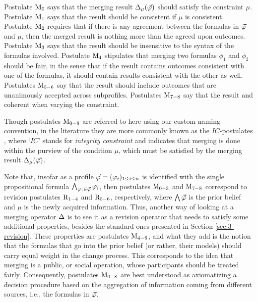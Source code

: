 Postulate $\ppm{0}$ says that the merging result $\me_{\mu}(\P)$ should
satisfy the constraint $\mu$.
Postulate $\ppm{1}$ says that the result 
should be consistent if $\mu$ is consistent.
Postulate $\ppm{2}$ requires that if there 
is any agreement between the formulas in $\P$ and $\mu$,
then the merged result is nothing more than the agreed upon outcomes.
Postulate $\ppm{3}$ says that the result 
should be insensitive to the syntax of the formulas involved.
Postulate $\ppm{4}$ stipulates that merging two formulas $\phi_1$ and $\phi_2$ should be fair,
in the sense that if the result contains outcomes consistent with one of the formulas, it should contain 
results consistent with the other as well.
Postulates $\ppm{5-6}$ say that the result should
include outcomes that are unanimously accepted across subprofiles.
Postulates $\ppm{7-8}$ say that the result 
and coherent when varying the constraint.

Though postulates $\ppm{0-8}$ are referred to here using our custom naming convention,
in the literature they are more commonly known as the $IC$-postulates \cite{KoniecznyP02,KoniecznyP11},
where `$IC$' stands for \emph{integrity constraint} and indicates that merging is done within the purview of 
the condition $\mu$, which must be satisfied by the merging result $\me_\mu(\P)$.

Note that, insofar as a profile $\P=(\phi_i)_{1\le i \le n}$ 
is identified with the single propositional 
formula $\bigwedge_{\phi_i\in\P}\phi_{i}$, 
then postulates $\ppm{0-3}$ and $\ppm{7-8}$ correspond to revision postulates
$\ppr{1-4}$ and $\ppr{5-6}$, respectively,
where $\bigwedge\P$ is the prior belief and $\mu$ is the newly acquired information.
Thus, another way of looking at a merging operator $\me$ 
is to see it as a revision operator that needs to satisfy some additional
properties, besides the standard ones presented in Section \ref{sec:3-revision}.
These properties are postulates $\ppm{4-6}$, and what they add 
is the notion that the formulas that go into the prior belief (or rather, their models)
should carry equal weight in the change process. 
This corresponds to the idea that merging is a public, 
or social operation, whose participants should be treated fairly.
Consequently, postulates $\ppm{0-8}$ are best understood as axiomatizing a decision procedure 
based on the aggregation of information coming from different sources, i.e., the formulas in $\P$.

